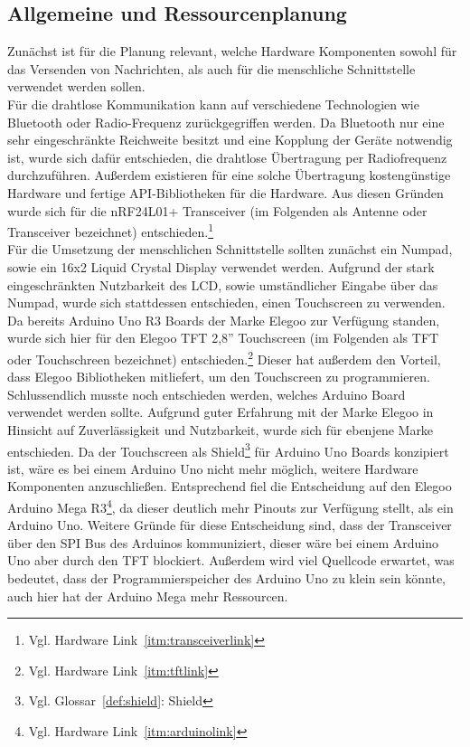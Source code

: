 \documentclass[a4paper, 11pt]{scrartcl}
\begin{document}
\subsection{Allgemeine und Ressourcenplanung}\label{ch:planning}
Zunächst ist für die Planung relevant, welche Hardware Komponenten sowohl für das Versenden von Nachrichten, als auch für die menschliche Schnittstelle verwendet werden sollen.
\\
Für die drahtlose Kommunikation kann auf verschiedene Technologien wie Bluetooth oder Radio-Frequenz zurückgegriffen werden. Da Bluetooth nur eine sehr eingeschränkte
Reichweite besitzt und eine Kopplung der Geräte notwendig ist, wurde sich dafür entschieden, die drahtlose Übertragung per Radiofrequenz durchzuführen. Außerdem existieren
für eine solche Übertragung kostengünstige Hardware und fertige API-Bibliotheken für die Hardware. Aus diesen Gründen wurde sich für die nRF24L01+ Transceiver 
(im Folgenden als \glqq Antenne\grqq{} oder \glqq Transceiver\grqq{} bezeichnet) entschieden.\footnote{Vgl. Hardware Link~\ref{itm:transceiverlink}}
\\
Für die Umsetzung der menschlichen Schnittstelle sollten zunächst ein Numpad, sowie ein 16x2 Liquid Crystal Display verwendet werden. Aufgrund der stark eingeschränkten Nutzbarkeit des LCD,
sowie umständlicher Eingabe über das Numpad, wurde sich stattdessen entschieden, einen Touchscreen zu verwenden. Da bereits Arduino Uno R3 Boards der Marke Elegoo zur Verfügung standen,
wurde sich hier für den Elegoo TFT 2,8'' Touchscreen (im Folgenden als \glqq TFT\grqq{} oder \glqq Touchschreen\grqq{} bezeichnet) entschieden.\footnote{Vgl. Hardware Link~\ref{itm:tftlink}} Dieser
hat außerdem den Vorteil, dass Elegoo Bibliotheken mitliefert, um den Touchscreen zu programmieren.
\\
Schlussendlich musste noch entschieden werden, welches Arduino Board verwendet werden sollte. Aufgrund guter Erfahrung mit der Marke Elegoo in Hinsicht auf Zuverlässigkeit und Nutzbarkeit, wurde sich für
ebenjene Marke entschieden. Da der Touchscreen als Shield\footnote{Vgl. Glossar~\ref{def:shield}: Shield} für Arduino Uno Boards konzipiert ist, wäre es bei einem Arduino Uno nicht mehr möglich,
weitere Hardware Komponenten anzuschließen. Entsprechend fiel die Entscheidung auf den Elegoo Arduino Mega R3\footnote{Vgl. Hardware Link~\ref{itm:arduinolink}}, da dieser deutlich mehr Pinouts zur Verfügung
stellt, als ein Arduino Uno. Weitere Gründe für diese Entscheidung sind, dass der Transceiver über den SPI Bus des Arduinos kommuniziert, dieser wäre bei einem Arduino Uno aber durch den TFT blockiert. Außerdem
wird viel Quellcode erwartet, was bedeutet, dass der Programmierspeicher des Arduino Uno zu klein sein könnte, auch hier hat der Arduino Mega mehr Ressourcen.
\end{document}
